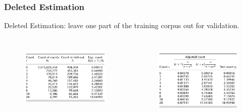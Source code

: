 \documentclass{beamer}
\begin{document}
\begin{frame}\frametitle{Deleted Estimation}

Deleted Estimation: leave one part of the training corpus out
for validation.

\begin{columns}[c] %

\begin{figure}
\includegraphics[width=0.9\linewidth]{figure/deleted_estimation.pdf}
\label{fig:deleted_estimation}
\end{figure}


\begin{figure}
\includegraphics[width=0.9\linewidth]{figure/test_count.pdf}
\label{fig:test_acount}
\end{figure}

\end{columns}

\end{frame}
\end{document}

